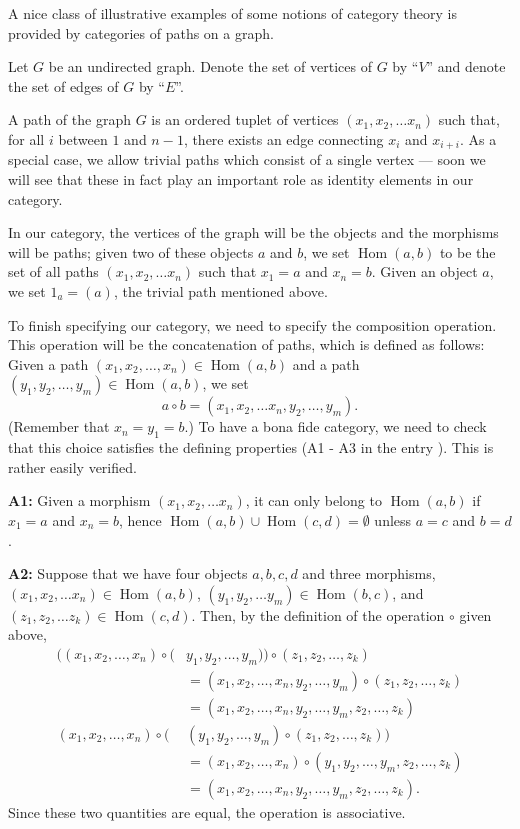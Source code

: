 \documentclass[12pt]{article}
\begin{document}
A nice class of illustrative examples of some notions of category theory 
is provided by categories of paths on a graph.

Let $G$ be an undirected graph.  Denote the set of vertices of $G$ by ``$V$'' 
and denote the set of edges of $G$ by ``$E$''.  

A path of the graph $G$ is an ordered tuplet of vertices $(x_1, x_2, \ldots x_n)$
such that, for all $i$ between $1$ and $n-1$, there exists an edge connecting
$x_i$ and $x_{i+i}$.  As a special case, we allow trivial paths which consist
of a  single vertex --- soon we will see that these in fact play an important 
role as identity elements in our category.

In our category, the vertices of the graph will be the objects and the 
morphisms will be paths; given two of these objects $a$ and $b$, we set 
$\operatorname{Hom}(a,b)$ to be the set of all paths $(x_1, x_2, \ldots x_n)$ 
such that $x_1 = a$ and $x_n = b$.  Given an object $a$, we set $1_a = (a)$, 
the trivial path mentioned above.

To finish specifying our category, we need to specify the composition operation.
This operation will be the concatenation of paths, which is defined as follows:
Given a path $(x_1, x_2, \ldots, x_n) \in \operatorname{Hom}(a,b)$ and a path
$(y_1, y_2, \ldots, y_m) \in \operatorname{Hom}(a,b)$, we set 
\[
a \circ b = (x_1, x_2, \ldots x_n, y_2, \ldots, y_m).\] 
(Remember that $x_n = y_1 = b$.)  To have a bona fide category, we need to 
check that this choice satisfies the defining properties (A1 - A3 in the 
entry ).  This is rather easily verified.  

\textbf{A1:} Given a morphism $(x_1, x_2, \ldots x_n)$, it can only
belong to $\operatorname{Hom}(a,b)$ if $x_1 = a$ and $x_n = b$, hence
$\operatorname{Hom}(a,b) \cup \operatorname{Hom}(c,d) = \emptyset$ unless
$a = c$ and $b = d$.

\textbf{A2:}  Suppose that we have four objects $a,b,c,d$ and three 
morphisms, $(x_1, x_2, \ldots x_n) \in \operatorname{Hom}(a,b)$,
$(y_1, y_2, \ldots y_m) \in \operatorname{Hom}(b,c)$, and 
$(z_1, z_2, \ldots z_k) \in \operatorname{Hom}(c,d)$.  Then,
by the definition of the operation $\circ$ given above,
\begin{align*}
((x_1, x_2, \ldots, x_n) \circ 
(&y_1, y_2, \ldots, y_m)) \circ
(z_1, z_2, \ldots, z_k) \\ &= 
(x_1, x_2, \ldots, x_n, y_2, \ldots, y_m) \circ
(z_1, z_2, \ldots, z_k) \\ &=
(x_1, x_2, \ldots, x_n, y_2, \ldots, y_m, z_2, \ldots, z_k) \\
(x_1, x_2, \ldots, x_n) \circ 
(&(y_1, y_2, \ldots, y_m)  \circ
(z_1, z_2, \ldots, z_k)) \\ &= 
(x_1, x_2, \ldots, x_n) \circ 
(y_1, y_2, \ldots, y_m, z_2, \ldots, z_k) \\ &=
(x_1, x_2, \ldots, x_n, y_2, \ldots, y_m, z_2, \ldots, z_k).
\end{align*}
Since these two quantities are equal, the operation is associative.
\end{document}
